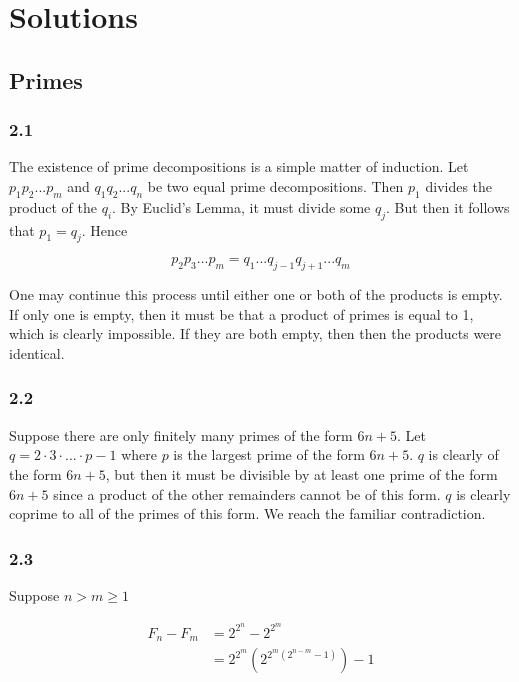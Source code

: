 \section{Solutions}

\subsection{Primes}

\subsubsection{2.1}
The existence of prime decompositions is a simple matter 
of induction. Let $p_1 p_2 ... p_m$ and $q_1q_2...q_n$ be 
two equal prime decompositions. Then $p_1$ divides the 
product of the $q_i$. By Euclid's Lemma, it must divide 
some $q_j$. But then it follows that $p_1 = q_j$. Hence

\begin{equation*}
    p_2 p_3 ... p_m = q_1 ... q_{j-1}q_{j+1} ... q_m
\end{equation*}

One may continue this process until either one or both of 
the products is empty. If only one is empty, then it must 
be that a product of primes is equal to 1, which is 
clearly impossible. If they are both empty, then then 
the products were identical.

\subsubsection{2.2}

Suppose there are only finitely many primes of the form 
$6n+5$. Let $q = 2 \cdot 3 \cdot ... \cdot p - 1$ where 
$p$ is the largest prime of the form $6n+5$. $q$ is 
clearly of the form $6n+5$, but then it must be divisible 
by at least one prime of the form $6n+5$ since a product 
of the other remainders cannot be of this form. 
$q$ is clearly coprime to all of the primes of this form. 
We reach the familiar contradiction.

\subsubsection{2.3}
Suppose $n>m\geq 1$

\begin{align*}
    F_n - F_m &= 2^{2^n} - 2^{2^m} \\
    &= 2^{2^m}(2^{2^m(2^{n-m} - 1)}) - 1 
\end{align*}

